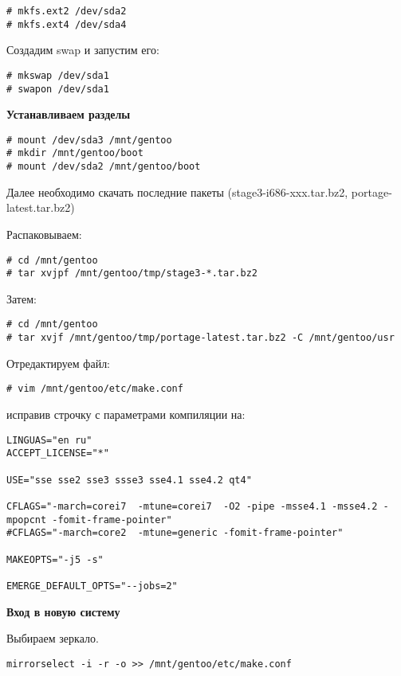 \documentclass[12pt, a4paper]{article}
\begin{document}
\begin{verbatim}
# mkfs.ext2 /dev/sda2
# mkfs.ext4 /dev/sda4
\end{verbatim}

Создадим swap и запустим его:

\begin{verbatim}
# mkswap /dev/sda1
# swapon /dev/sda1
\end{verbatim}

{\bf Устанавливаем разделы}

\begin{verbatim}
# mount /dev/sda3 /mnt/gentoo
# mkdir /mnt/gentoo/boot
# mount /dev/sda2 /mnt/gentoo/boot
\end{verbatim}

Далее необходимо скачать последние пакеты (stage3-i686-xxx.tar.bz2, portage-latest.tar.bz2)

Распаковываем:

\begin{verbatim}
# cd /mnt/gentoo
# tar xvjpf /mnt/gentoo/tmp/stage3-*.tar.bz2
\end{verbatim}

Затем:

\begin{verbatim}
# cd /mnt/gentoo
# tar xvjf /mnt/gentoo/tmp/portage-latest.tar.bz2 -C /mnt/gentoo/usr
\end{verbatim}

Отредактируем файл:

\begin{verbatim}
# vim /mnt/gentoo/etc/make.conf
\end{verbatim}

исправив строчку с параметрами компиляции на:

\begin{verbatim}
LINGUAS="en ru"
ACCEPT_LICENSE="*"

USE="sse sse2 sse3 ssse3 sse4.1 sse4.2 qt4"

CFLAGS="-march=corei7  -mtune=corei7  -O2 -pipe -msse4.1 -msse4.2 -mpopcnt -fomit-frame-pointer"
#CFLAGS="-march=core2  -mtune=generic -fomit-frame-pointer"

MAKEOPTS="-j5 -s"

EMERGE_DEFAULT_OPTS="--jobs=2"
\end{verbatim}


{\bf Вход в новую систему}


Выбираем зеркало.

\begin{verbatim}
mirrorselect -i -r -o >> /mnt/gentoo/etc/make.conf
\end{verbatim}
\end{document}
